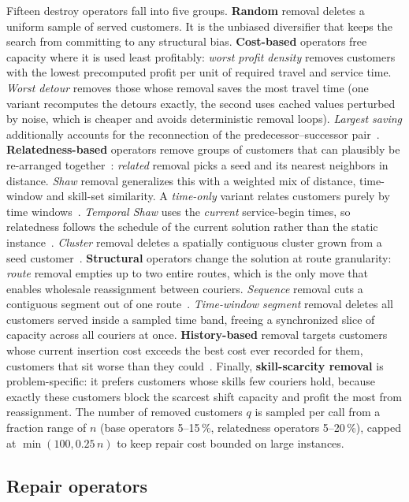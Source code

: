 \documentclass[10pt, a4paper]{article}
\begin{document}
Fifteen destroy operators fall into five groups.
\textbf{Random} removal deletes a uniform sample of served customers. It is
the unbiased diversifier that keeps the search from committing to any
structural bias.
\textbf{Cost-based} operators free capacity where it is used least
profitably: \emph{worst profit density} removes customers with the lowest
precomputed profit per unit of required travel and service time.
\emph{Worst detour} removes those whose removal saves the most travel time
(one variant recomputes the detours exactly, the second uses cached values
perturbed by noise, which is cheaper and avoids deterministic removal
loops). \emph{Largest saving} additionally accounts for the reconnection of
the predecessor--successor pair~\cite{hammami2020}.
\textbf{Relatedness-based} operators remove groups of customers that can
plausibly be re-arranged together~\cite{shaw1998}: \emph{related} removal
picks a seed and its nearest neighbors in distance. \emph{Shaw} removal
generalizes this with a weighted mix of distance, time-window and
skill-set similarity. A \emph{time-only} variant relates customers purely
by time windows~\cite{demir2012}. \emph{Temporal Shaw} uses the
\emph{current} service-begin times, so relatedness follows the schedule of
the current solution rather than the static instance~\cite{kovacs2012}.
\emph{Cluster} removal deletes a spatially contiguous cluster grown from a
seed customer~\cite{kovacs2012}.
\textbf{Structural} operators change the solution at route granularity:
\emph{route} removal empties up to two entire routes, which is the only
move that enables wholesale reassignment between couriers. \emph{Sequence}
removal cuts a contiguous segment out of one route~\cite{hammami2020}.
\emph{Time-window segment} removal deletes all customers served inside a
sampled time band, freeing a synchronized slice of capacity across all
couriers at once.
\textbf{History-based} removal targets customers whose current insertion
cost exceeds the best cost ever recorded for them, customers that sit
worse than they could~\cite{ropke2006}.
Finally, \textbf{skill-scarcity removal} is problem-specific: it prefers
customers whose skills few couriers hold, because exactly these customers
block the scarcest shift capacity and profit the most from reassignment.
The number of removed customers $q$ is sampled per call from a fraction
range of $n$ (base operators 5--15\,\%, relatedness operators 5--20\,\%),
capped at $\min(100, 0.25\,n)$ to keep repair cost bounded on large
instances.

\subsection{Repair operators}
\end{document}
